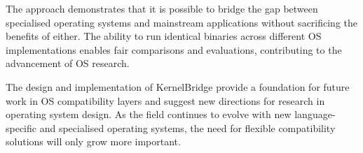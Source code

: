 \documentclass[conference]{IEEEtran}
\begin{document}
The approach demonstrates that it is possible to bridge the gap between specialised operating systems and mainstream applications without sacrificing the benefits of either. The ability to run identical binaries across different OS implementations enables fair comparisons and evaluations, contributing to the advancement of OS research.

The design and implementation of KernelBridge provide a foundation for future work in OS compatibility layers and suggest new directions for research in operating system design. As the field continues to evolve with new language-specific and specialised operating systems, the need for flexible compatibility solutions will only grow more important.



\end{document}
